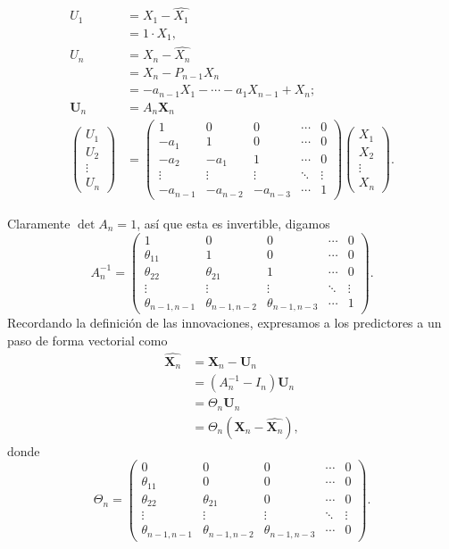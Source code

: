 \documentclass[11pt,letterpaper]{article}
\theoremstyle{definition}
\theoremstyle{theorem}
\theoremstyle{remark}
\begin{document}
	\begin{align*}
		U_1&=X_1-\hat{X_1} \\
		&=1\cdot X_1, \\
		U_n&=X_n-\hat{X_n} \\
		&=X_n-P_{n-1}X_n \\
		&=-a_{n-1}X_1-\cdots-a_1X_{n-1}+X_n; \\
		\boldsymbol{U}_n&=A_n\boldsymbol{X}_n \\
		\begin{pmatrix}U_1\\U_2\\\vdots\\U_n\end{pmatrix}&=\begin{pmatrix}1&0&0&\cdots&0\\-a_1&1&0&\cdots&0\\-a_2&-a_1&1&\cdots&0\\\vdots&\vdots&\vdots&\ddots&\vdots\\-a_{n-1}&-a_{n-2}&-a_{n-3}&\cdots&1\end{pmatrix}\begin{pmatrix}X_1\\X_2\\\vdots\\X_n\end{pmatrix}.
	\end{align*}
	\par Claramente \(\det A_n=1\), así que esta es invertible, digamos
	\[A^{-1}_n=\begin{pmatrix}1&0&0&\cdots&0\\\theta_{11}&1&0&\cdots&0\\\theta_{22}&\theta_{21}&1&\cdots&0\\\vdots&\vdots&\vdots&\ddots&\vdots\\\theta_{n-1,n-1}&\theta_{n-1,n-2}&\theta_{n-1,n-3}&\cdots&1\end{pmatrix}.\]
	Recordando la definición de las innovaciones, expresamos a los predictores a un paso de forma vectorial como
	\begin{align*}
		\hat{\boldsymbol{X}_n}&=\boldsymbol{X}_n-\boldsymbol{U}_n \\
		&=\left(A^{-1}_n-I_n\right)\boldsymbol{U}_n \\
		&=\Theta_n\boldsymbol{U}_n \\
		&=\Theta_n(\boldsymbol{X}_n-\hat{\boldsymbol{X}_n}),
	\end{align*}
	donde
	\[\Theta_n=\begin{pmatrix}0&0&0&\cdots&0\\\theta_{11}&0&0&\cdots&0\\\theta_{22}&\theta_{21}&0&\cdots&0\\\vdots&\vdots&\vdots&\ddots&\vdots\\\theta_{n-1,n-1}&\theta_{n-1,n-2}&\theta_{n-1,n-3}&\cdots&0\end{pmatrix}.\]
\end{document}
